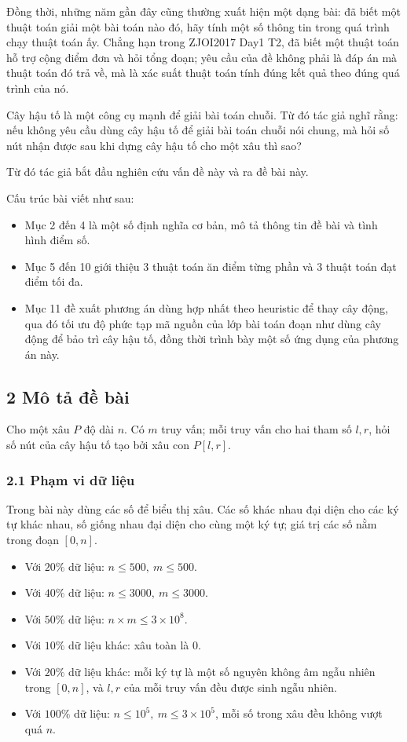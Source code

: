 \documentclass[11pt]{article}
\begin{document}
Đồng thời, những năm gần đây cũng thường xuất hiện một dạng bài: đã biết một
thuật toán giải một bài toán nào đó, hãy tính một số thông tin trong quá trình
chạy thuật toán ấy. Chẳng hạn trong ZJOI2017 Day1 T2, đã biết một thuật toán hỗ
trợ cộng điểm đơn và hỏi tổng đoạn; yêu cầu của đề không phải là đáp án mà
thuật toán đó trả về, mà là xác suất thuật toán tính đúng kết quả theo đúng quá
trình của nó.

Cây hậu tố là một công cụ mạnh để giải bài toán chuỗi. Từ đó tác giả nghĩ rằng:
nếu không yêu cầu dùng cây hậu tố để giải bài toán chuỗi nói chung, mà hỏi số
nút nhận được sau khi dựng cây hậu tố cho một xâu thì sao?

Từ đó tác giả bắt đầu nghiên cứu vấn đề này và ra đề bài này.

Cấu trúc bài viết như sau:
\begin{itemize}
  \item Mục 2 đến 4 là một số định nghĩa cơ bản, mô tả thông tin đề bài và tình
  hình điểm số.
  \item Mục 5 đến 10 giới thiệu 3 thuật toán ăn điểm từng phần và 3 thuật toán
  đạt điểm tối đa.
  \item Mục 11 đề xuất phương án dùng hợp nhất theo heuristic để thay cây động,
  qua đó tối ưu độ phức tạp mã nguồn của lớp bài toán đoạn như dùng cây động để
  bảo trì cây hậu tố, đồng thời trình bày một số ứng dụng của phương án này.
\end{itemize}

\subsection*{2 Mô tả đề bài}

Cho một xâu \(P\) độ dài \(n\). Có \(m\) truy vấn; mỗi truy vấn cho hai tham số
\(l,r\), hỏi số nút của cây hậu tố tạo bởi xâu con \(P[l,r]\).

\subsubsection*{2.1 Phạm vi dữ liệu}

Trong bài này dùng các số để biểu thị xâu. Các số khác nhau đại diện cho các ký
tự khác nhau, số giống nhau đại diện cho cùng một ký tự; giá trị các số nằm
trong đoạn \([0,n]\).

\begin{itemize}
  \item Với \(20\%\) dữ liệu: \(n\le 500,\ m\le 500\).
  \item Với \(40\%\) dữ liệu: \(n\le 3000,\ m\le 3000\).
  \item Với \(50\%\) dữ liệu: \(n\times m\le 3\times 10^8\).
  \item Với \(10\%\) dữ liệu khác: xâu toàn là \(0\).
  \item Với \(20\%\) dữ liệu khác: mỗi ký tự là một số nguyên không âm ngẫu nhiên
  trong \([0,n]\), và \(l,r\) của mỗi truy vấn đều được sinh ngẫu nhiên.
  \item Với \(100\%\) dữ liệu: \(n\le 10^5,\ m\le 3\times 10^5\), mỗi số trong
  xâu đều không vượt quá \(n\).
\end{itemize}
\end{document}
